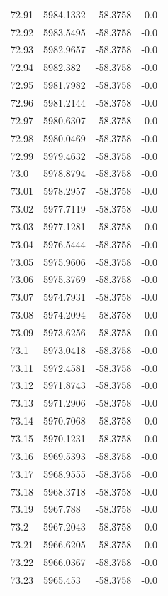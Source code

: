 \begin{table}[H]
\begin{tabular}{llll}
72.91 & 5984.1332 & -58.3758 & -0.0 \\
72.92 & 5983.5495 & -58.3758 & -0.0 \\
72.93 & 5982.9657 & -58.3758 & -0.0 \\
72.94 & 5982.382 & -58.3758 & -0.0 \\
72.95 & 5981.7982 & -58.3758 & -0.0 \\
72.96 & 5981.2144 & -58.3758 & -0.0 \\
72.97 & 5980.6307 & -58.3758 & -0.0 \\
72.98 & 5980.0469 & -58.3758 & -0.0 \\
72.99 & 5979.4632 & -58.3758 & -0.0 \\
73.0 & 5978.8794 & -58.3758 & -0.0 \\
73.01 & 5978.2957 & -58.3758 & -0.0 \\
73.02 & 5977.7119 & -58.3758 & -0.0 \\
73.03 & 5977.1281 & -58.3758 & -0.0 \\
73.04 & 5976.5444 & -58.3758 & -0.0 \\
73.05 & 5975.9606 & -58.3758 & -0.0 \\
73.06 & 5975.3769 & -58.3758 & -0.0 \\
73.07 & 5974.7931 & -58.3758 & -0.0 \\
73.08 & 5974.2094 & -58.3758 & -0.0 \\
73.09 & 5973.6256 & -58.3758 & -0.0 \\
73.1 & 5973.0418 & -58.3758 & -0.0 \\
73.11 & 5972.4581 & -58.3758 & -0.0 \\
73.12 & 5971.8743 & -58.3758 & -0.0 \\
73.13 & 5971.2906 & -58.3758 & -0.0 \\
73.14 & 5970.7068 & -58.3758 & -0.0 \\
73.15 & 5970.1231 & -58.3758 & -0.0 \\
73.16 & 5969.5393 & -58.3758 & -0.0 \\
73.17 & 5968.9555 & -58.3758 & -0.0 \\
73.18 & 5968.3718 & -58.3758 & -0.0 \\
73.19 & 5967.788 & -58.3758 & -0.0 \\
73.2 & 5967.2043 & -58.3758 & -0.0 \\
73.21 & 5966.6205 & -58.3758 & -0.0 \\
73.22 & 5966.0367 & -58.3758 & -0.0 \\
73.23 & 5965.453 & -58.3758 & -0.0 \\

\end{tabular}
\end{table}
